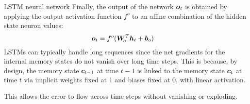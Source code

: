 \begin{frame}{LSTM neural network}
Finally, the
output of the network ${\boldsymbol o}_t$ is obtained by applying the output
activation function $f^o$ to an affine combination of the hidden state
neuron values:
\begin{align*}
    {\boldsymbol o}_t & = f^o({\boldsymbol W}_{\!o}^T{\boldsymbol h}_t + {\boldsymbol b}_{o})
\end{align*}
%
LSTMs can typically handle long sequences since the net gradients for
the internal memory states do not vanish over long time steps. This is
because, by design, the memory state ${\boldsymbol c}_{t-1}$ at time $t-1$ is linked
to the memory state ${\boldsymbol c}_t$ at time $t$ via implicit weights fixed at 1
and biases fixed at 0, with linear activation. 

\medskip

This allows the error to flow across
time steps without vanishing or exploding.
\end{frame}
%
%
%
